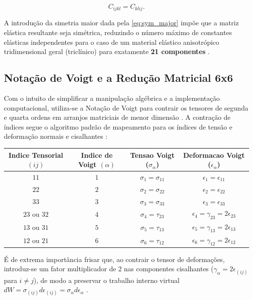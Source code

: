 \begin{equation}
    C_{ijkl} = C_{klij}.
\end{equation} \label{eq:sym_major}

A introdução da simetria maior dada pela \eqref{eq:sym_major} impõe que a matriz elástica resultante seja simétrica, reduzindo o número máximo de constantes elásticas independentes para o caso de um material elástico anisotrópico tridimensional geral (triclínico) para exatamente \textbf{21 componentes} \cite{Timoshenko_1951}.

\subsection{Notação de Voigt e a Redução Matricial 6x6}

Com o intuito de simplificar a manipulação algébrica e a implementação computacional, utiliza-se a Notação de Voigt para contrair os tensores de segunda e quarta ordens em arranjos matriciais de menor dimensão \cite{Sadd2009}. A contração de índices segue o algoritmo padrão de mapeamento para os índices de tensão e deformação normais e cisalhantes :

\begin{quadro}[htbp]
\centering
\caption{Notacao de Voigt: correspondencia entre indices tensoriais e de Voigt.}
\label{tab:voigt_notation}
\begin{tabular}{c c c c}
\hline
\textbf{Indice Tensorial $(ij)$} & \textbf{Indice de Voigt $(\alpha)$} & \textbf{Tensao Voigt ($\sigma_\alpha$)} & \textbf{Deformacao Voigt ($\epsilon_\alpha$)} \\ \hline
$11$ & $1$ & $\sigma_1 = \sigma_{11}$ & $\epsilon_1 = \epsilon_{11}$ \\
$22$ & $2$ & $\sigma_2 = \sigma_{22}$ & $\epsilon_2 = \epsilon_{22}$ \\
$33$ & $3$ & $\sigma_3 = \sigma_{33}$ & $\epsilon_3 = \epsilon_{33}$ \\
$23$ ou $32$ & $4$ & $\sigma_4 = \tau_{23}$ & $\epsilon_4 = \gamma_{23} = 2\epsilon_{23}$ \\
$13$ ou $31$ & $5$ & $\sigma_5 = \tau_{13}$ & $\epsilon_5 = \gamma_{13} = 2\epsilon_{13}$ \\
$12$ ou $21$ & $6$ & $\sigma_6 = \tau_{12}$ & $\epsilon_6 = \gamma_{12} = 2\epsilon_{12}$ \\ \hline
\end{tabular}
\end{quadro}

É de extrema importância frisar que, ao contrair o tensor de deformações, introduz-se um fator multiplicador de 2 nas componentes cisalhantes ($\gamma_\alpha = 2\epsilon_{(i j)}$ para $i \neq  j$), de modo a preservar o trabalho interno virtual $d W = \sigma_{(i j)} d \epsilon_{(i j)} = \sigma_\alpha d \epsilon_\alpha$ \cite{Sadd2009}.

